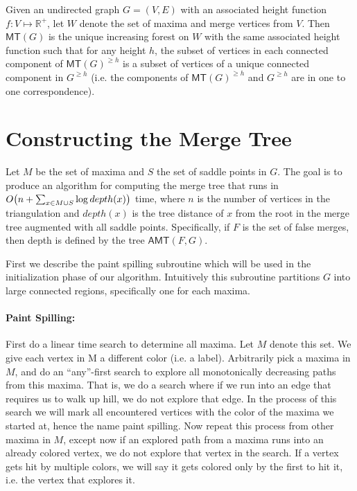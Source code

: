 \documentclass[A4paper,11pt]{article}
\newcommand{\RR}{\mathbb{R}}
\newcommand{\AMT}{\ensuremath{\mathsf{AMT}}\xspace}
\newcommand{\MT}{\ensuremath{\mathsf{MT}}\xspace}
\begin{document}
\begin{lemma}
Given an undirected graph $G=(V,E)$ with an associated height function $f:V \mapsto \RR^+$, let $W$ denote the set of maxima and merge vertices from $V$.  Then $\MT(G)$ is the unique increasing forest on $W$ with the same associated height function such that for any height $h$, the subset of vertices in each connected component of $\MT(G)^{\geq h}$ is a subset of vertices of a unique connected component in $G^{\geq h}$ (i.e. the components of $\MT(G)^{\geq h}$ and $G^{\geq h}$ are in one to one correspondence).
\end{lemma}





\section{Constructing the Merge Tree}
%
Let $M$ be the set of maxima and $S$ the set of saddle points in $G$.  The goal is to produce an algorithm for computing the merge tree that runs in $O\!\left({n+\sum_{x\in M\cup S} \log depth(x)}\right)$ time, where $n$ is the number of vertices in the triangulation and $depth(x)$ is the tree distance of $x$ from the root in the merge tree augmented with all saddle points.  
Specifically, if $F$ is the set of false merges, then depth is defined by the tree $\AMT(F, G)$.  

First we describe the paint spilling subroutine which will be used in the initialization phase of our algorithm.  Intuitively this subroutine partitions $G$ into large connected regions, specifically one for each maxima.

\paragraph{Paint Spilling:}
First do a linear time search to determine all maxima.  Let $M$ denote this set.  We give each vertex in M a different color (i.e. a label). Arbitrarily pick a maxima in $M$, and do an ``any''-first search to explore all monotonically decreasing paths from this maxima.  That is, we do a search where if we run into an edge that requires us to walk up hill, we do not explore that edge.  In the process of this search we will mark all encountered vertices with the color of the maxima we started at, hence the name paint spilling.  Now repeat this process from other maxima in $M$, except now if an explored path from a maxima runs into an already colored vertex, we do not explore that vertex in the search.  If a vertex gets hit by multiple colors, we will say it gets colored only by the first to hit it, i.e. the vertex that explores it.
\end{document}
